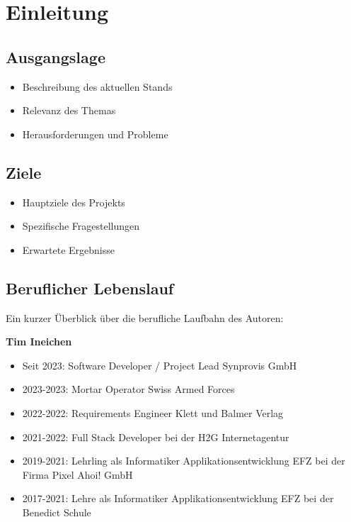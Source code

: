 \section{Einleitung}



\subsection{Ausgangslage}
\begin{itemize}
    \item Beschreibung des aktuellen Stands
    \item Relevanz des Themas
    \item Herausforderungen und Probleme
\end{itemize}

\subsection{Ziele}
\begin{itemize}
    \item Hauptziele des Projekts
    \item Spezifische Fragestellungen
    \item Erwartete Ergebnisse
\end{itemize}

\subsection{Beruflicher Lebenslauf}

Ein kurzer Überblick über die berufliche Laufbahn des Autoren:


\textbf{Tim Ineichen}
\begin{itemize}
    \item Seit 2023: Software Developer / Project Lead Synprovis GmbH
    \item 2023-2023: Mortar Operator Swiss Armed Forces
    \item 2022-2022: Requirements Engineer Klett und Balmer Verlag
    \item 2021-2022: Full Stack Developer bei der H2G Internetagentur
    \item 2019-2021: Lehrling als Informatiker Applikationsentwicklung EFZ bei der Firma Pixel Ahoi! GmbH
    \item 2017-2021: Lehre als Informatiker Applikationsentwicklung EFZ bei der Benedict Schule
\end{itemize}

